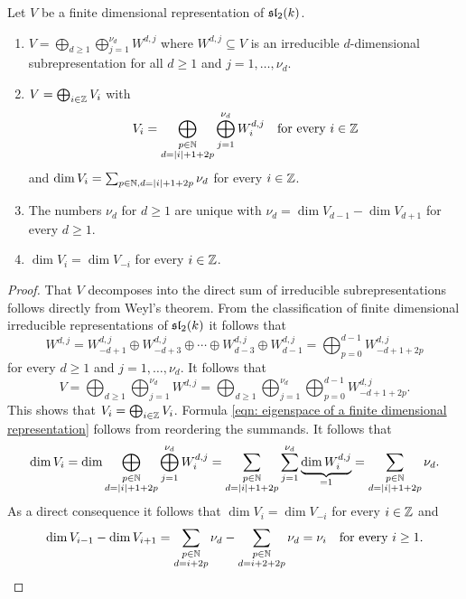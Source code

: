 \begin{thrm}\label{thrm: finite dimensional representations of sl2}
 Let $V$ be a finite dimensional representation of $\mathfrak{sl}_2(k)$.
 \begin{enumerate}[leftmargin=*]
  \item
   $V = \bigoplus_{d \geq 1} \bigoplus_{j=1}^{\nu_d} W^{d,j}$ where $W^{d,j} \subseteq V$ is an irreducible $d$-dimensional subrepresentation for all $d \geq 1$ and $j = 1, \dotsc, \nu_d$.
  \item
   $V = \bigoplus_{i \in \mathbb{Z}} V_i$ with
   \begin{equation}\label{eqn: eigenspace of a finite dimensional representation}
    V_i = \bigoplus_{\substack{p \in \mathbb{N} \\ d = |i|+1+2p}} \bigoplus_{j=1}^{\nu_d} W^{d,j}_i
    \quad \text{for every $i \in \mathbb{Z}$}
   \end{equation}
   and $\dim V_i = \sum_{p \in \mathbb{N}, d = |i|+1+2p} \nu_d$ for every $i \in \mathbb{Z}$.
  \item 
   The numbers $\nu_d$ for $d \geq 1$ are unique with $\nu_d = \dim V_{d-1} - \dim V_{d+1}$ for every $d \geq 1$.
  \item
   $\dim V_i = \dim V_{-i}$ for every $i \in \mathbb{Z}$.
 \end{enumerate}
\end{thrm}
\begin{proof}
 That $V$ decomposes into the direct sum of irreducible subrepresentations follows directly from Weyl’s theorem. From the classification of finite dimensional irreducible representations of $\mathfrak{sl}_2(k)$ it follows that
 \[
  W^{d,j}
  = W^{d,j}_{-d+1} \oplus W^{d,j}_{-d+3} \oplus \dotsb \oplus W^{d,j}_{d-3} \oplus W^{d,j}_{d-1}
  = \bigoplus_{p=0}^{d-1} W^{d,j}_{-d+1+2p}
 \]
 for every $d \geq 1$ and $j = 1, \dotsc, \nu_d$. It follows that
 \[
  V
  = \bigoplus_{d \geq 1} \bigoplus_{j=1}^{\nu_d} W^{d,j}
  = \bigoplus_{d \geq 1} \bigoplus_{j=1}^{\nu_d} \bigoplus_{p=0}^{d-1} W^{d,j}_{-d+1+2p}.
 \]
 This shows that $V_i = \bigoplus_{i \in \mathbb{Z}} V_i$. Formula \eqref{eqn: eigenspace of a finite dimensional representation} follows from reordering the summands. It follows that
 \[
  \dim V_i
  = \dim \bigoplus_{\substack{p \in \mathbb{N} \\ d = |i|+1+2p}} \bigoplus_{j=1}^{\nu_d} W^{d,j}_i
  = \sum_{\substack{p \in \mathbb{N} \\ d = |i|+1+2p}} \sum_{j=1}^{\nu_d} \underbrace{\dim W^{d,j}_i}_{=1}
  = \sum_{\substack{p \in \mathbb{N} \\ d = |i|+1+2p}} \nu_d.
 \]
 As a direct consequence it follows that $\dim V_i = \dim V_{-i}$ for every $i \in \mathbb{Z}$ and
 \[
  \dim V_{i-1} - \dim V_{i+1}
  = \sum_{\substack{p \in \mathbb{N} \\ d = i+2p}} \nu_d - \sum_{\substack{p \in \mathbb{N} \\ d = i+2+2p}} \nu_d
  = \nu_i
  \quad\text{for every $i \geq 1$}.
 \qedhere
 \]
\end{proof}


